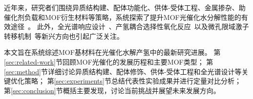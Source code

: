 
近年来，研究者们围绕异质结构建、配体功能化、供体-受体工程、金属掺杂、助催化剂负载和MOF衍生材料等策略，系统探索了提升MOF光催化水分解性能的有效途径~\citep{zhang2025optimization_strategies}。 %
此外，全光谱响应设计~\citep{mof_fullspectrum_2025}、产氢耦合选择性氧化反应~\citep{lin2025coupled_oxidation}以及微孔限域激子转移机制~\citep{zhou2023micropore_exciton}等新兴方向也引起广泛关注。 %

本文旨在系统综述MOF基材料在光催化水解产氢中的最新研究进展。
第\ref{sec:related-work}节回顾MOF光催化的发展历程和主要MOF类型；
第\ref{sec:method}节详细讨论异质结构建、配体修饰、供体-受体工程和全光谱设计等关键优化策略；
第\ref{sec:experiments}节总结代表性实验成果并进行定量对比分析；
第\ref{sec:conclusion}节概括主要发现，讨论当前挑战并展望未来发展方向。
